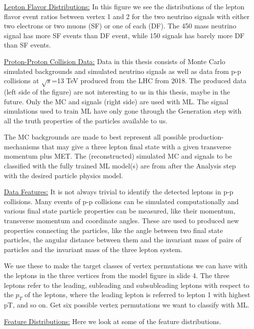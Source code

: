 \documentclass[a4paper, american, 12pt]{report}
\begin{document}
	\underline{Lepton Flavor Distributions:}
	In this figure we see the distributions of the lepton flavor event ratios between vertex 1 and 2 for the two neutrino signals with either two electrons or two muons (SF) or one of each (DF). The 450 mass neutrino signal has more SF events than DF event, while 150 signals has barely more DF than SF events.
	
	
	\underline{Proton-Proton Collision Data:}
	Data in this thesis consists of Monte Carlo simulated backgrounds and simulated neutrino signals as well as data from p-p collisions at $\sqrt{s}$=13 TeV produced from the LHC from 2018. The produced data (left side of the figure) are not interesting to us in this thesis, maybe in the future. Only the MC and signals (right side) are used with ML. The signal simulations used to train ML have only gone through the Generation step with all the truth properties of the particles available to us. 
	
	The MC backgrounds are made to best represent all possible production-mechanisms that may give a three lepton final state with a given transverse momentum plus MET. The (reconstructed) simulated MC and signals to be classified with the fully trained ML model(s) are from after the Analysis step with the desired particle physics model.
	
	
	\underline{Data Features:}
	It is not always trivial to identify the detected leptons in p-p collisions. Many events of p-p collisions can be simulated computationally and various final state particle properties can be measured, like their momentum, transverse momentum and coordinate angles. These are used to produced new properties connecting the particles, like the angle between two final state particles, the angular distance between them and the invariant mass of pairs of particles and the invariant mass of the three lepton system.
	
	We use these to make the target classes of vertex permutations we can have with the leptons in the three vertices from the model figure in slide 4. The three leptons refer to the leading, subleading and subsubleading leptons with respect to the $p_T$ of the leptons, where the leading lepton is referred to lepton 1 with highest pT, and so on. Get six possible vertex permutations we want to classify with ML.
	
	
	\underline{Feature Distributions:}
	Here we look at some of the feature distributions.
	
\end{document}
